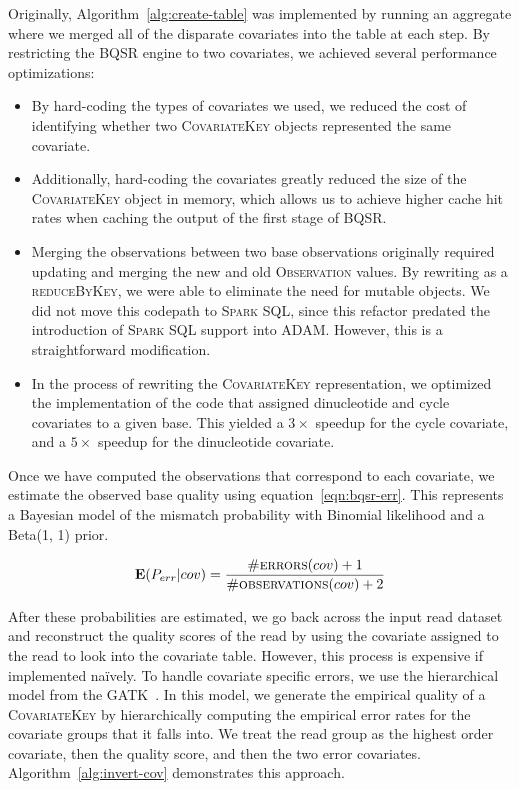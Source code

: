 \documentclass[phd]{ucbthesis}
\begin{document}
Originally, Algorithm~\ref{alg:create-table} was implemented by running an
aggregate where we merged all of the disparate covariates into the table at each
step. By restricting the BQSR engine to two covariates, we achieved several
performance optimizations:

\begin{itemize}
\item By hard-coding the types of covariates we used, we reduced the cost of
  identifying whether two \textsc{CovariateKey} objects represented the same
  covariate.
\item Additionally, hard-coding the covariates greatly reduced the size of the
  \textsc{CovariateKey} object in memory, which allows us to achieve higher
  cache hit rates when caching the output of the first stage of BQSR.
\item Merging the observations between two base observations originally required
  updating and merging the new and old \textsc{Observation} values. By rewriting
  as a \textsc{reduceByKey}, we were able to eliminate the need for mutable
  objects. We did not move this codepath to \textsc{Spark SQL}, since this
  refactor predated the introduction of \textsc{Spark SQL} support into ADAM.
  However, this is a straightforward modification.
\item In the process of rewriting the \textsc{CovariateKey} representation, we
  optimized the implementation of the code that assigned dinucleotide and cycle
  covariates to a given base. This yielded a $3\times$ speedup for the cycle
  covariate, and a $5\times$ speedup for the dinucleotide covariate.\cite{fixme}
\end{itemize}

Once we have computed the observations that correspond to each covariate, we
estimate the observed base quality using equation~\eqref{eqn:bqsr-err}. This
represents a Bayesian model of the mismatch probability with Binomial
likelihood and a Beta(1, 1) prior.

\begin{equation}
\label{eqn:bqsr-err}
\mathbf{E}(P_{err}|{cov}) = \frac{\textsc{\#errors}(cov) + 1}{\textsc{\#observations}(cov) + 2}
\end{equation}

After these probabilities are estimated, we go back across the input read
dataset and reconstruct the quality scores of the read by using the covariate
assigned to the read to look into the covariate table. However, this process is
expensive if implemented na\"{i}vely. To handle covariate specific errors, we
use the hierarchical model from the \textsc{GATK}~\cite{depristo11}. In this
model, we generate the empirical quality of a \textsc{CovariateKey} by
hierarchically computing the empirical error rates for the covariate
groups that it falls into. We treat the read group as the highest order
covariate, then the quality score, and then the two error covariates.
Algorithm~\ref{alg:invert-cov} demonstrates this approach.
\end{document}
